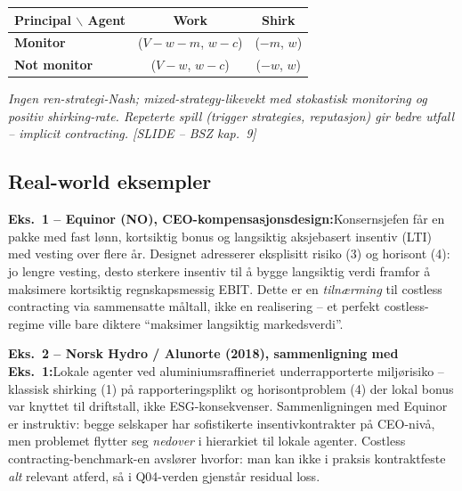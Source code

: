 \begin{center}
\renewcommand{\arraystretch}{1.2}
\begin{tabular}{@{}l|c|c|@{}}
\textbf{Principal $\backslash$ Agent} & \textbf{Work} & \textbf{Shirk} \\
\hline
\textbf{Monitor} & ($V-w-m$,\; $w-c$) & ($-m$,\; $w$) \\
\hline
\textbf{Not monitor} & ($V-w$,\; $w-c$) & ($-w$,\; $w$) \\
\hline
\end{tabular}
\end{center}
\textit{Ingen ren-strategi-Nash; mixed-strategy-likevekt med stokastisk monitoring og positiv shirking-rate. Repeterte spill (trigger strategies, reputasjon) gir bedre utfall -- \emph{implicit contracting}. [SLIDE -- BSZ kap.\ 9]}

\subsection*{Real-world eksempler}

\textbf{Eks.~1 -- Equinor (NO), CEO-kompensasjonsdesign:}\quad [EKS]
Konsernsjefen får en pakke med fast lønn, kortsiktig bonus og langsiktig aksjebasert insentiv (LTI) med vesting over flere år. Designet adresserer eksplisitt risiko (3) og horisont (4): jo lengre vesting, desto sterkere insentiv til å bygge langsiktig verdi framfor å maksimere kortsiktig regnskapsmessig EBIT. Dette er en \emph{tilnærming} til costless contracting via sammensatte måltall, ikke en realisering -- et perfekt costless-regime ville bare diktere ``maksimer langsiktig markedsverdi''.

\textbf{Eks.~2 -- Norsk Hydro / Alunorte (2018), sammenligning med Eks.~1:}\quad [EKS]
Lokale agenter ved alumin\-iumsraffineriet under\-rapporterte miljørisiko -- klassisk shirking (1) på rapporteringsplikt og horisontproblem (4) der lokal bonus var knyttet til driftstall, ikke ESG-konsekvenser. Sammenligningen med Equinor er instruktiv: begge selskaper har sofistikerte insentivkontrakter på CEO-nivå, men problemet flytter seg \emph{nedover} i hierarkiet til lokale agenter. Costless contracting-benchmark-en avslører hvorfor: man kan ikke i praksis kontraktfeste \emph{alt} relevant atferd, så i Q04-verden gjenstår residual loss.


